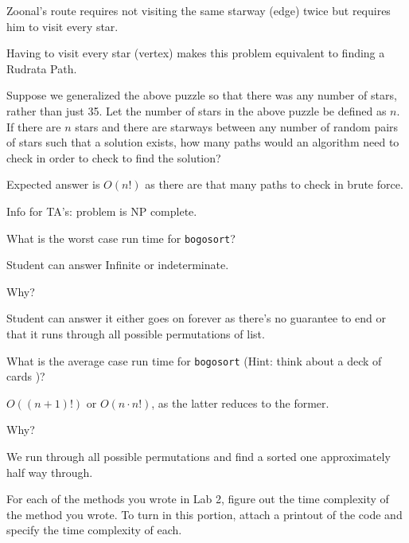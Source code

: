 \documentclass[letter,answers,addpoints]{exam}
\begin{document}
\begin{questions}
\begin{solution}[\stretch{1}]
Zoonal's route requires not visiting the same starway (edge) twice but requires him to visit every star.

Having to visit every star (vertex) makes this problem equivalent to finding a Rudrata Path.
\end{solution}

\question[10] Suppose we generalized the above puzzle so that there was any number of stars, rather than
just 35. Let the number of stars in the above puzzle be defined as $n$. If there are $n$ stars and there are starways between any number of random pairs of stars such that a solution exists, how many paths would an algorithm need to check in order to check to find the solution?



\begin{solution}[\stretch{1}]
	Expected answer is $O(n!)$ as there are that many paths to check in brute force.
	
	
	Info for TA's: problem is NP complete.
	
\end{solution}

	\newpage
		\question[5] What is the worst case run time for \texttt{bogosort}?
		\begin{solution}[\stretch{1}]
			Student can answer Infinite or indeterminate.
		\end{solution}
		
		\question[5] Why?
		\begin{solution}[\stretch{1}]
			Student can answer it either goes on forever as there's no guarantee to end or that it runs through all possible permutations of list.
		\end{solution}
		
		\question[5] What is the average case run time for \texttt{bogosort} (Hint: think about a deck of cards )? 
		\begin{solution}[\stretch{1}]
		$ O((n+1)!) $ or $ O(n \cdot n!) $, as the latter reduces to the former.
			
			
		\end{solution}
		
		\question[5] Why?
		
		\begin{solution}[\stretch{1}]
			We run through all possible permutations and find a sorted one approximately half way through.
		\end{solution}
		
	\newpage
	\question[20]  For each of the methods you wrote in Lab 2, figure out the time complexity of the method you wrote.
	To turn in this portion, attach a printout of the code and specify the time complexity of each.
	
	
		
	\end{questions}
	
\end{document}
